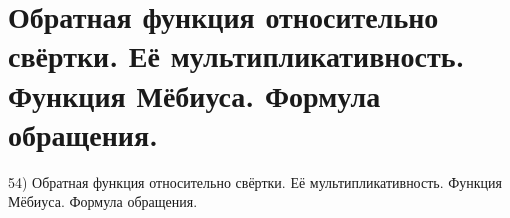 \section{
 Обратная функция относительно свёртки. Её мультипликативность. Функция Мёбиуса. Формула обращения.
}

54) Обратная функция относительно свёртки. Её мультипликативность. Функция Мёбиуса. Формула обращения.
